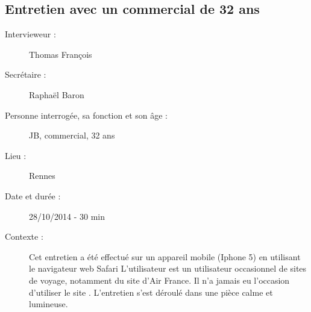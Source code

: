\subsection{Entretien avec un commercial de 32 ans}

\begin{description}
\item [Intervieweur :] Thomas Fran\c{c}ois
\item [Secr\'{e}taire :] Rapha\"{e}l Baron
\item [Personne interrog\'{e}e, sa fonction et son \^{a}ge :] JB, commercial, 32 ans
\item [Lieu :] Rennes
\item [Date et dur\'{e}e :] 28/10/2014 - 30 min
\item [Contexte :] Cet entretien a \'{e}t\'{e} effectu\'{e} sur un appareil mobile (Iphone 5) en utilisant le navigateur web Safari L'utilisateur est un utilisateur occasionnel de sites de voyage, notamment du site d'Air France. Il n'a jamais eu l'occasion d'utiliser le site \kel. L'entretien s'est d\'{e}roul\'{e} dans une pi\`{e}ce calme et lumineuse. 
\end{description}


